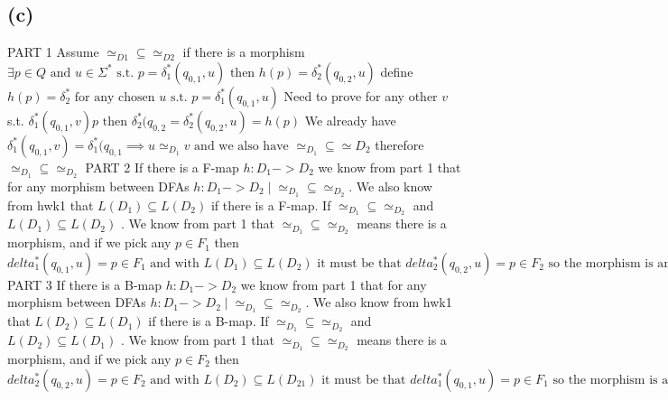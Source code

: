\documentclass[12pt]{article}
\begin{document}
\subsection*{(c)}
PART 1\newline
Assume $\simeq_{D1} \subseteq \simeq_{D2}$\newline
if there is a morphism $\exists p \in Q \text{ and } u \in \Sigma^{*} \text{ s.t. } p = \delta_1^{*}(q_{0,1}, u) \text{ then } h(p) = \delta^{*}_2(q_{0,2}, u)$\newline
define $h(p) = \delta^{*}_2 \text{ for any chosen } u \text{ s.t. } p = \delta^{*}_1(q_{0,1}, u)$\newline
Need to prove for any other $v$ s.t. $\delta^{*}_1(q_{0,1}, v)  p \text{ then } \delta^{*}_2 (q_{0,2} = \delta^{*}_2(q_{0,2}, u) = h(p)$\newline
We already have $\delta^{*}_1(q_{0,1} , v) = \delta^{*}_1(q_{0,1} \implies u \simeq_{D_1} v \text{ and we also have } \simeq_{D_1} \subseteq \simeq{D_2}$\newline
therefore $\simeq_{D_1} \subseteq \simeq_{D_2}$\newline
PART 2\newline
If there is a F-map $h: D_1 -> D_2$ we know from part 1 that for any morphism between DFAs $h: D_1 -> D_2 \mid \simeq_{D_1} \subseteq \simeq_{D_2}$.  We also know from hwk1 that $L(D_1) \subseteq L(D_2)$ if there is a F-map.\newline
If $\simeq_{D_1} \subseteq \simeq_{D_2}$ and $L(D_1) \subseteq L(D_2)$ . We know from part 1 that $\simeq_{D_1} \subseteq \simeq_{D_2}$ means there is a morphism, and if we pick any $p \in F_1$ then $delta^{*}_1(q_{0,1}, u) = p \in F_1 \text{ and with } L(D_1) \subseteq L(D_2) \text{ it must be that } delta^{*}_2(q_{0,2}, u) = p \in F_2 \text{ so the morphism is an F-map. }$\newline
PART 3\newline
If there is a B-map $h: D_1 -> D_2$ we know from part 1 that for any morphism between DFAs $h: D_1 -> D_2 \mid \simeq_{D_1} \subseteq \simeq_{D_2}$.  We also know from hwk1 that $L(D_2) \subseteq L(D_1)$ if there is a B-map.\newline
If $\simeq_{D_1} \subseteq \simeq_{D_2}$ and $L(D_2) \subseteq L(D_1)$ . We know from part 1 that $\simeq_{D_1} \subseteq \simeq_{D_2}$ means there is a morphism, and if we pick any $p \in F_2$ then $delta^{*}_2(q_{0,2}, u) = p \in F_2 \text{ and with } L(D_2) \subseteq L(D_21) \text{ it must be that } delta^{*}_1(q_{0,1}, u) = p \in F_1 \text{ so the morphism is a B-map. }$\newline
\end{document}
